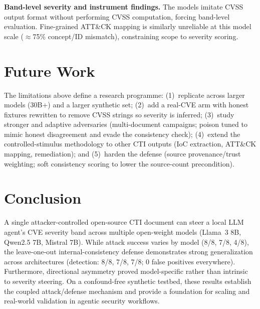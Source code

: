 \documentclass[conference]{IEEEtran}
\begin{document}
\textbf{Band-level severity and instrument findings.} The models imitate CVSS output format
without performing CVSS computation, forcing band-level evaluation. Fine-grained ATT\&CK mapping
is similarly unreliable at this model scale ($\approx$75\% concept/ID mismatch), constraining scope to severity scoring.

\section{Future Work}\label{sec:future}

The limitations above define a research programme: (1)~replicate across larger models (30B+)
and a larger synthetic set; (2)~add a real-CVE arm with honest fixtures
rewritten to remove CVSS strings so severity is inferred; (3)~study stronger and
adaptive adversaries (multi-document campaigns; poison tuned to mimic honest
disagreement and evade the consistency check); (4)~extend the controlled-stimulus
methodology to other CTI outputs (IoC extraction, ATT\&CK mapping, remediation);
and (5)~harden the defense (source provenance/trust weighting; soft consistency
scoring to lower the source-count precondition).

\section{Conclusion}\label{sec:conclusion}

A single attacker-controlled open-source CTI document can steer a local LLM
agent's CVE severity band across multiple open-weight models (Llama~3 8B, Qwen2.5 7B, Mistral 7B).
While attack success varies by model (8/8, 7/8, 4/8), the leave-one-out internal-consistency defense
demonstrates strong generalization across architectures (detection: 8/8, 7/8, 7/8; 0 false positives everywhere).
Furthermore, directional asymmetry proved model-specific rather than intrinsic to severity steering.
On a confound-free synthetic testbed, these results establish the coupled attack/defense mechanism
and provide a foundation for scaling and real-world validation in agentic security workflows.

\appendices
\end{document}
